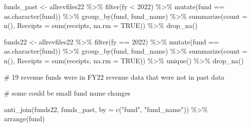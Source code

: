 \documentclass[
  letterpaper,
  DIV=11,
  numbers=noendperiod]{scrreport}
\newenvironment{Shaded}{\begin{snugshade}}{\end{snugshade}}
\newcommand{\AttributeTok}[1]{\textcolor[rgb]{0.40,0.45,0.13}{#1}}
\newcommand{\CommentTok}[1]{\textcolor[rgb]{0.37,0.37,0.37}{#1}}
\newcommand{\ConstantTok}[1]{\textcolor[rgb]{0.56,0.35,0.01}{#1}}
\newcommand{\DecValTok}[1]{\textcolor[rgb]{0.68,0.00,0.00}{#1}}
\newcommand{\FunctionTok}[1]{\textcolor[rgb]{0.28,0.35,0.67}{#1}}
\newcommand{\NormalTok}[1]{\textcolor[rgb]{0.00,0.23,0.31}{#1}}
\newcommand{\OtherTok}[1]{\textcolor[rgb]{0.00,0.23,0.31}{#1}}
\newcommand{\SpecialCharTok}[1]{\textcolor[rgb]{0.37,0.37,0.37}{#1}}
\newcommand{\StringTok}[1]{\textcolor[rgb]{0.13,0.47,0.30}{#1}}
\begin{document}
\begin{Shaded}
\begin{Highlighting}[]
\NormalTok{funds\_past }\OtherTok{\textless{}{-}}\NormalTok{ allrevfiles22  }\SpecialCharTok{\%\textgreater{}\%} 
  \FunctionTok{filter}\NormalTok{(fy }\SpecialCharTok{\textless{}} \DecValTok{2022}\NormalTok{) }\SpecialCharTok{\%\textgreater{}\%} 
  \FunctionTok{mutate}\NormalTok{(fund }\SpecialCharTok{==} \FunctionTok{as.character}\NormalTok{(fund)) }\SpecialCharTok{\%\textgreater{}\%} 
  \FunctionTok{group\_by}\NormalTok{(fund, fund\_name) }\SpecialCharTok{\%\textgreater{}\%} 
  \FunctionTok{summarize}\NormalTok{(}\AttributeTok{count =} \FunctionTok{n}\NormalTok{(), }\AttributeTok{Receipts =} \FunctionTok{sum}\NormalTok{(receipts, }\AttributeTok{na.rm =} \ConstantTok{TRUE}\NormalTok{))  }\SpecialCharTok{\%\textgreater{}\%} 
  \FunctionTok{drop\_na}\NormalTok{()}

\NormalTok{funds22 }\OtherTok{\textless{}{-}}\NormalTok{ allrevfiles22  }\SpecialCharTok{\%\textgreater{}\%} 
  \FunctionTok{filter}\NormalTok{(fy }\SpecialCharTok{==} \DecValTok{2022}\NormalTok{) }\SpecialCharTok{\%\textgreater{}\%} 
  \FunctionTok{mutate}\NormalTok{(fund }\SpecialCharTok{==} \FunctionTok{as.character}\NormalTok{(fund)) }\SpecialCharTok{\%\textgreater{}\%} 
  \FunctionTok{group\_by}\NormalTok{(fund, fund\_name) }\SpecialCharTok{\%\textgreater{}\%}  
  \FunctionTok{summarize}\NormalTok{(}\AttributeTok{count =} \FunctionTok{n}\NormalTok{(), }\AttributeTok{Receipts =} \FunctionTok{sum}\NormalTok{(receipts, }\AttributeTok{na.rm =} \ConstantTok{TRUE}\NormalTok{)) }\SpecialCharTok{\%\textgreater{}\%} 
  \FunctionTok{unique}\NormalTok{() }\SpecialCharTok{\%\textgreater{}\%} 
  \FunctionTok{drop\_na}\NormalTok{()}

\CommentTok{\# 19 revenue funds were in FY22 revenue data that were not in past data }

\CommentTok{\# some could be small fund name changes}

\FunctionTok{anti\_join}\NormalTok{(funds22, funds\_past, }\AttributeTok{by =} \FunctionTok{c}\NormalTok{(}\StringTok{"fund"}\NormalTok{, }\StringTok{"fund\_name"}\NormalTok{)) }\SpecialCharTok{\%\textgreater{}\%} \FunctionTok{arrange}\NormalTok{(fund)}
\end{Highlighting}
\end{Shaded}
\end{document}

